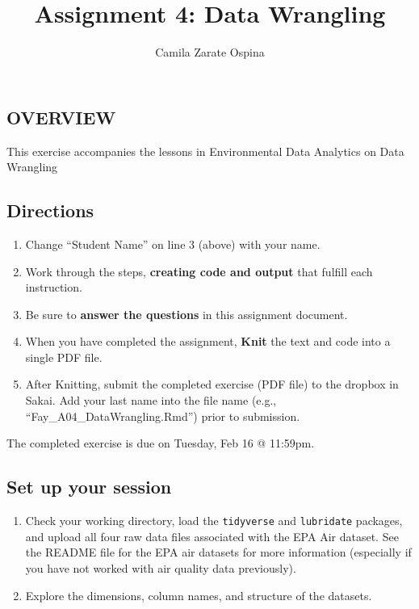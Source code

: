 \documentclass[
]{article}
\title{Assignment 4: Data Wrangling}
\author{Camila Zarate Ospina}
\date{}
\providecommand{\tightlist}{%
  \setlength{\itemsep}{0pt}\setlength{\parskip}{0pt}}
\begin{document}
\maketitle

\hypertarget{overview}{%
\subsection{OVERVIEW}\label{overview}}

This exercise accompanies the lessons in Environmental Data Analytics on
Data Wrangling

\hypertarget{directions}{%
\subsection{Directions}\label{directions}}

\begin{enumerate}
\def\labelenumi{\arabic{enumi}.}
\tightlist
\item
  Change ``Student Name'' on line 3 (above) with your name.
\item
  Work through the steps, \textbf{creating code and output} that fulfill
  each instruction.
\item
  Be sure to \textbf{answer the questions} in this assignment document.
\item
  When you have completed the assignment, \textbf{Knit} the text and
  code into a single PDF file.
\item
  After Knitting, submit the completed exercise (PDF file) to the
  dropbox in Sakai. Add your last name into the file name (e.g.,
  ``Fay\_A04\_DataWrangling.Rmd'') prior to submission.
\end{enumerate}

The completed exercise is due on Tuesday, Feb 16 @ 11:59pm.

\hypertarget{set-up-your-session}{%
\subsection{Set up your session}\label{set-up-your-session}}

\begin{enumerate}
\def\labelenumi{\arabic{enumi}.}
\item
  Check your working directory, load the \texttt{tidyverse} and
  \texttt{lubridate} packages, and upload all four raw data files
  associated with the EPA Air dataset. See the README file for the EPA
  air datasets for more information (especially if you have not worked
  with air quality data previously).
\item
  Explore the dimensions, column names, and structure of the datasets.
\end{enumerate}
\end{document}
